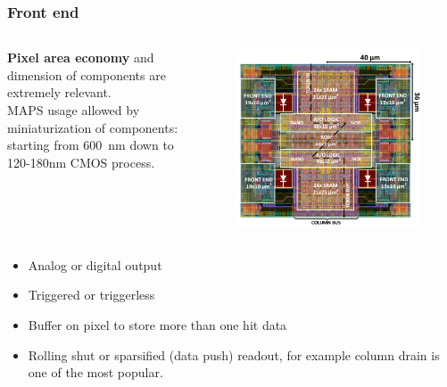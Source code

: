     \begin{frame}
        \frametitle{Front end}
            \begin{columns}
                \textbf{Pixel area economy} and dimension of components are extremely relevant. \\
                MAPS usage allowed by miniaturization of components: starting from \SI{600}{nm} down to 120-180{nm} CMOS process.
                    \begin{figure}[h!]
                        \vspace*{-0.85cm}
                        \includegraphics[width=1.05\linewidth]{figures/Monopix1/Monopix1_2x2pixelsgroup.png}
                    \end{figure}
            \end{columns}
        \begin{itemize}
            \item Analog or digital output
            \item Triggered or triggerless
            \item Buffer on pixel to store more than one hit data
            \item Rolling shut or sparsified (data push) readout, for example column drain is one of the most popular.
        \end{itemize}
 
    \end{frame} 


